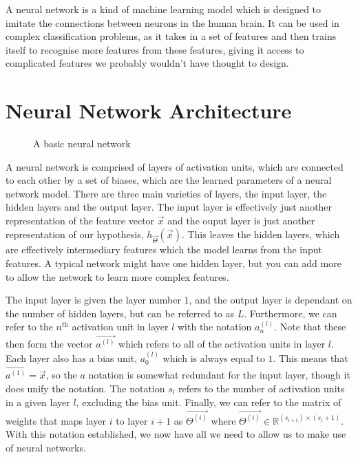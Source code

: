 A neural network is a kind of machine learning model which is designed to imitate the connections between neurons in the human brain.
It can be used in complex classification problems, as it takes in a set of features and then trains itself to recognise more features
from these features, giving it access to complicated features we probably wouldn't have thought to design.

\section{Neural Network Architecture}
\begin{figure}[ht]
    \centering
    \caption{A basic neural network}
    \label{fig:neural-network-one}
\end{figure}

A neural network is comprised of layers of activation units, which are connected to each other by a set of biases, which are the learned parameters
of a neural network model. There are three main varieties of layers, the input layer, the hidden layers and the output layer. The input layer is
effectively just another representation of the feature vector $\vec{x}$ and the ouput layer is just another representation of our hypothesis,
$h_{\vec{\Theta}}(\vec{x})$. This leaves the hidden layers, which are effectively intermediary features which the model learns from the input features.
A typical network might have one hidden layer, but you can add more to allow the network to learn more complex features.

\vspace{1em}

The input layer is given the layer number $1$, and the output layer is dependant on the number of hidden layers, but can be referred to as $L$.
Furthermore, we can refer to the $n^{\textit{th}}$ activation unit in layer $l$ with the notation $a^{(l)}_n$. Note that these then form the vector $\vec{a^{(l)}}$
which refers to all of the activation units in layer $l$. Each layer also has a bias unit, $a^{(l)}_0$ which is always equal to $1$. This means that
$\vec{a^{(1)}} = \vec{x}$, so the $a$ notation is somewhat redundant for the input layer, though it does unify the notation.
The notation $s_l$ refers to the number of activation units in a given layer $l$, excluding the bias unit. Finally, we can refer to the matrix of weights
that maps layer $i$ to layer $i + 1$ as $\vec{\Theta^{(i)}}$ where  $\vec{\Theta^{(i)}} \in \mathbb{R}^{(s_{i+1}) \times (s_i + 1)}$.
With this notation established, we now have all we need to allow us to make use of neural networks.

